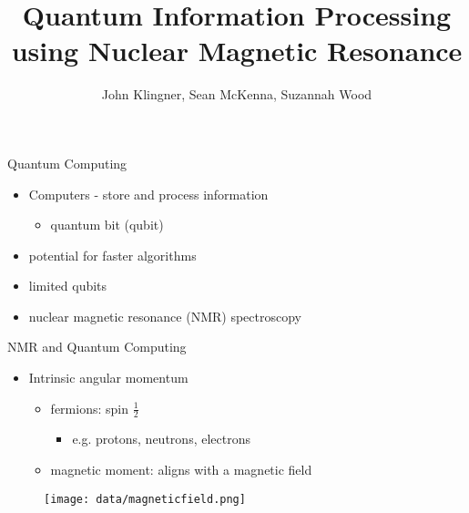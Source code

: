 \documentclass{beamer}
\title[Quantum Processing with NMR]{Quantum Information Processing\\using Nuclear Magnetic Resonance}
\author{John Klingner, Sean McKenna, Suzannah Wood}
\institute{Cornell College}
\begin{document}
\begin{frame}
\titlepage
\end{frame}


\begin{frame}{Quantum Computing}
	\begin{itemize}
	\item Computers - store and process information 
		\begin{itemize}
			\item quantum bit (qubit)
		\end{itemize}
	\vspace{1em}
	\item potential for faster algorithms
	\vspace{1em}
	\item limited qubits
	\item nuclear magnetic resonance (NMR) spectroscopy
	\vspace{1em}
	\end{itemize}
\end{frame}

\begin{frame}{NMR and Quantum Computing}
	\begin{itemize}
	\item Intrinsic angular momentum\cite{QMbook}
		\begin{itemize}
		\item fermions: spin $\frac{1}{2}$
			\begin{itemize}
			\item e.g. protons, neutrons, electrons
			\end{itemize}
		\item magnetic moment: aligns with a magnetic field
		\end{itemize}
	\end{itemize}
	\begin{figure}	
	\texttt{[image: data/magneticfield.png]}
	\end{figure}
\end{frame}
\end{document}
